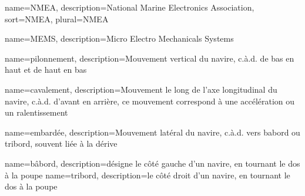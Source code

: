 

{
	name={NMEA}, %
	description={National Marine Electronics Association}, %
	sort={NMEA}, %
	plural={NMEA} %
}


 {
    name=MEMS,
    description={Micro Electro Mechanicals Systems}
}

 {
    name=pilonnement,
    description={Mouvement vertical du navire, c.à.d. de bas en haut et de haut en bas}
}

 {
    name=cavalement,
    description={Mouvement le long de l'axe longitudinal du navire, c.à.d. d'avant en arrière, ce mouvement correspond à une accélération ou un ralentissement}
}

 {
    name=embardée,
    description={Mouvement latéral du navire, c.à.d. vers babord ou tribord, souvent liée à la dérive}
}

 {
	name=bâbord,
	description={désigne le côté gauche d'un navire, en tournant le dos à la poupe}
}
 {
	name=tribord,
	description={le côté droit d'un navire, en tournant le dos à la poupe}
}
